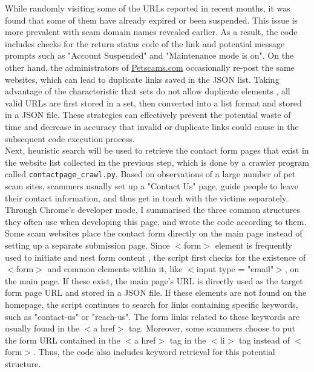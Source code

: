 \documentclass[ oneside,%
                    author={Cassie Qing Tang},
                    degree={BSc},
                     title={An Automated Response System for Disrupting Online Pet Scamming \\ },
                    subtitle={ }]{dissertation}
\begin{document}
While randomly visiting some of the URLs reported in recent months, it was found that some of them have already expired or been suspended. This issue is more prevalent with scam domain names revealed earlier. As a result, the code includes checks for the return status code of the link and potential message prompts such as "Account Suspended" and "Maintenance mode is on". On the other hand, the administrators of \href{www.petscams.com}{Petscams.com} occasionally re-post the same websites, which can lead to duplicate links saved in the JSON list. Taking advantage of the characteristic that sets do not allow duplicate elements \cite{sturtz_sets_nodate}, all valid URLs are first stored in a set, then converted into a list format and stored in a JSON file. These strategies can effectively prevent the potential waste of time and decrease in accuracy that invalid or duplicate links could cause in the subsequent code execution process.
\\

Next, heuristic search will be used to retrieve the contact form pages that exist in the website list collected in the previous step, which is done by a crawler program called \texttt{contactpage\_crawl.py}. Based on observations of a large number of pet scam sites, scammers usually set up a "Contact Us" page, guide people to leave their contact information, and thus get in touch with the victims separately. Through Chrome's developer mode, I summarised the three common structures they often use when developing this page, and wrote the code according to them.
\\

Some scam websites place the contact form directly on the main page instead of setting up a separate submission page. Since $<$form$>$ element is frequently used to initiate and nest form content \cite{noauthor_how_2024}, the script first checks for the existence of $<$form$>$ and common elements within it, like $<$input type = "email"$>$, on the main page. If these exist, the main page's URL is directly used as the target form page URL and stored in a JSON file. If these elements are not found on the homepage, the script continues to search for links containing specific keywords, such as "contact-us" or "reach-us". The form links related to these keywords are usually found in the $<$a href$>$ tag. Moreover, some scammers choose to put the form URL contained in the $<$a href$>$ tag in the $<$li$>$ tag instead of $<$form$>$. Thus, the code also includes keyword retrieval for this potential structure.
\end{document}
